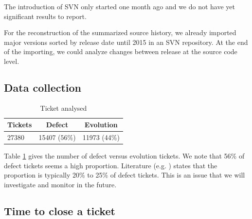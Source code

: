 \documentclass[10pt,conference]{IEEEtran}
\begin{document}
The introduction of SVN only started one month ago and we do not have yet significant results to report. 

For the reconstruction of the summarized source history, we already imported major versions sorted by release date until 2015 in an SVN repository. 
At the end of the importing, we could analyze changes between release at the source code level.

\subsection{Data collection}

\begin{table}[htbp]
  \begin{center}
    \caption{Ticket analysed}
    \label{tab:proportion}
    \begin{tabular}{| l | c |c|}
      \hline
      Tickets & Defect  & Evolution  \\
      \hline
      27380&15407 ($56\%$)&11973 (44\%)\\
      \hline 
    \end{tabular}
  \end{center}  
\end{table}

Table \ref{tab:proportion} gives the number of defect versus evolution tickets.
We note that 56\% of defect tickets seems a high proportion.
Literature (e.g. \citep*{Pigo96a} ) states that the proportion is typically 20\% to 25\% of defect tickets.
This is an issue that we will investigate and monitor in the future.

\subsection{Time to close a ticket}
\end{document}
